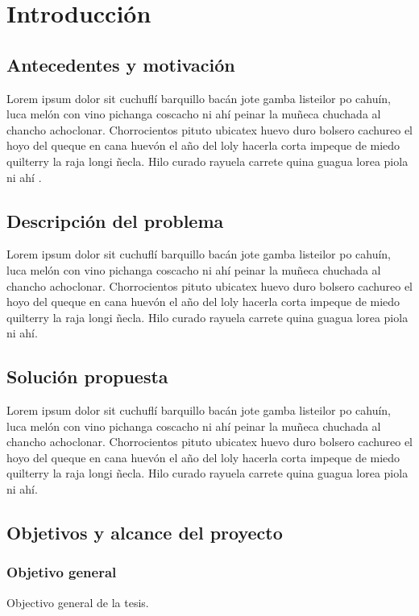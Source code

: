 \chapter{Introducción}
\label{cap:introduccion}

\section{Antecedentes y motivación}
\label{intro:motivacion}
Lorem ipsum dolor sit cuchuflí barquillo bacán jote gamba listeilor po cahuín, luca melón con vino pichanga coscacho ni ahí peinar la muñeca chuchada al chancho achoclonar. Chorrocientos pituto ubicatex huevo duro bolsero cachureo el hoyo del queque en cana huevón el año del loly hacerla corta impeque de miedo quilterry la raja longi ñecla. Hilo curado rayuela carrete quina guagua lorea piola ni ahí \citep{Codishetal2000}.

\section{Descripción del problema}
\label{intro:problema}
Lorem ipsum dolor sit cuchuflí barquillo bacán jote gamba listeilor po cahuín, luca melón con vino pichanga coscacho ni ahí peinar la muñeca chuchada al chancho achoclonar. Chorrocientos pituto ubicatex huevo duro bolsero cachureo el hoyo del queque en cana huevón el año del loly hacerla corta impeque de miedo quilterry la raja longi ñecla. Hilo curado rayuela carrete quina guagua lorea piola ni ahí.

\section{Solución propuesta}
\label{intro:solucion}
Lorem ipsum dolor sit cuchuflí barquillo bacán jote gamba listeilor po cahuín, luca melón con vino pichanga coscacho ni ahí peinar la muñeca chuchada al chancho achoclonar. Chorrocientos pituto ubicatex huevo duro bolsero cachureo el hoyo del queque en cana huevón el año del loly hacerla corta impeque de miedo quilterry la raja longi ñecla. Hilo curado rayuela carrete quina guagua lorea piola ni ahí.


\section{Objetivos y alcance del proyecto}
\label{intro:objetivos}

\subsection{Objetivo general}
	Objectivo general de la tesis.

